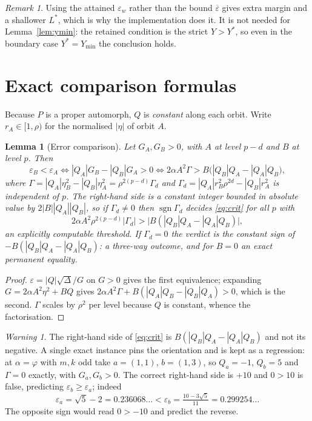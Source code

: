 \documentclass[11pt]{article}
\newtheorem{lemma}[theorem]{Lemma}
\theoremstyle{definition}
\theoremstyle{remark}
\newtheorem{remark}[theorem]{Remark}
\newtheorem{warning}[theorem]{Warning}
\newcommand{\epsbar}{\overline{\varepsilon}}
\newcommand{\epsw}{\varepsilon_w}
\newcommand{\sgn}{\operatorname{sgn}}
\begin{document}
\begin{remark}
Using the attained $\epsw$ rather than the bound $\epsbar$ gives extra margin and a shallower
$L^{*}$, which is why the implementation does it. It is not needed for
Lemma~\ref{lem:ymin}: the retained condition is the strict $Y>Y^{*}$, so even in the boundary
case $Y^{*}=Y_{\min}$ the conclusion holds.
\end{remark}

\section{Exact comparison formulas}\label{sec:compare}

Because $P$ is a proper automorph, $Q$ is \emph{constant} along each orbit. Write $r_A\in[1,\rho)$
for the normalised $|\eta|$ of orbit $A$.

\begin{lemma}[Error comparison]\label{lem:epscmp}
Let $G_A,G_B>0$, with $A$ at level $p-d$ and $B$ at level $p$. Then
\begin{equation}\label{eq:crit}
\varepsilon_B<\varepsilon_A
\iff |Q_A|G_B-|Q_B|G_A>0
\iff 2\alpha A^2\Gamma>B\bigl(|Q_B|Q_A-|Q_A|Q_B\bigr),
\end{equation}
where $\Gamma=|Q_A|\eta_B^2-|Q_B|\eta_A^2=\rho^{2(p-d)}\Gamma_d$ and
$\Gamma_d=|Q_A|r_B^2\rho^{2d}-|Q_B|r_A^2$ is independent of $p$. The right-hand side is a
constant integer bounded in absolute value by $2|B||Q_A||Q_B|$, so if $\Gamma_d\ne0$ then
$\sgn\Gamma_d$ decides \eqref{eq:crit} for all $p$ with
\begin{equation}\label{eq:epsthr}
2\alpha A^2\rho^{2(p-d)}|\Gamma_d|>\bigl|B(|Q_B|Q_A-|Q_A|Q_B)\bigr|,
\end{equation}
an explicitly computable threshold. If $\Gamma_d=0$ the verdict is the constant sign of
$-B(|Q_B|Q_A-|Q_A|Q_B)$: a three-way outcome, and for $B=0$ an \emph{exact permanent equality}.
\end{lemma}

\begin{proof}
$\varepsilon=|Q|\sqrt\Delta/G$ on $G>0$ gives the first equivalence; expanding
$G=2\alpha A^2\eta^2+BQ$ gives $2\alpha A^2\Gamma+B(|Q_A|Q_B-|Q_B|Q_A)>0$, which is the second.
$\Gamma$ scales by $\rho^2$ per level because $Q$ is constant, whence the factorisation.
\end{proof}

\begin{warning}\label{warn:sign}
The right-hand side of \eqref{eq:crit} is $B(|Q_B|Q_A-|Q_A|Q_B)$ and not its negative. A single
exact instance pins the orientation and is kept as a regression: at $\alpha=\varphi$ with
$m,k$ odd take $a=(1,1)$, $b=(1,3)$, so $Q_a=-1$, $Q_b=5$ and $\Gamma=0$ exactly, with
$G_a,G_b>0$. The correct right-hand side is $+10$ and $0>10$ is false, predicting
$\varepsilon_b\ge\varepsilon_a$; indeed
\[
\varepsilon_a=\sqrt5-2=0.236068\ldots<\varepsilon_b=\tfrac{10-3\sqrt5}{11}=0.299254\ldots
\]
The opposite sign would read $0>-10$ and predict the reverse.
\end{warning}
\end{document}
